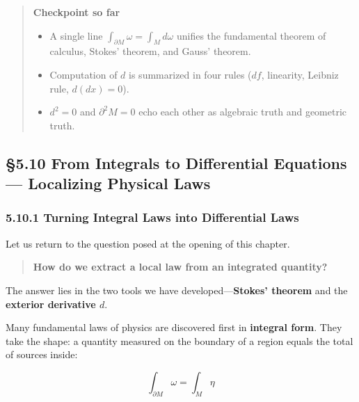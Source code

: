 \documentclass[a4paper,12pt,openany]{book}
\begin{document}
\begin{quote}
\textbf{Checkpoint so far}

\begin{itemize}
\item
  A single line \(\int_{\partial M} \omega = \int_M d\omega\) unifies
  the fundamental theorem of calculus, Stokes' theorem, and Gauss'
  theorem.
\item
  Computation of \(d\) is summarized in four rules (\(df\), linearity,
  Leibniz rule, \(d(dx)=0\)).
\item
  \(d^2=0\) and \(\partial^2 M=0\) echo each other as algebraic truth
  and geometric truth.
\end{itemize}
\end{quote}

\par\vspace{0.35em}\par

\hypertarget{from-integrals-to-differential-equations-localizing-physical-laws}{%
\subsection{§5.10 From Integrals to Differential Equations —
Localizing Physical
Laws}\label{from-integrals-to-differential-equations-localizing-physical-laws}}

\hypertarget{turning-integral-laws-into-differential-laws}{%
\subsubsection{5.10.1 Turning Integral Laws into Differential
Laws}\label{turning-integral-laws-into-differential-laws}}

Let us return to the question posed at the opening of this chapter.

\begin{quote}
\textbf{How do we extract a local law from an integrated quantity?}
\end{quote}

The answer lies in the two tools we have
developed—\textbf{Stokes' theorem} and the
\textbf{exterior derivative $d$}.

Many fundamental laws of physics are discovered first in
\textbf{integral form}. They take the shape: a quantity measured on the
boundary of a region equals the total of sources inside:

\[\int_{\partial M} \omega = \int_M \eta\]
\end{document}
